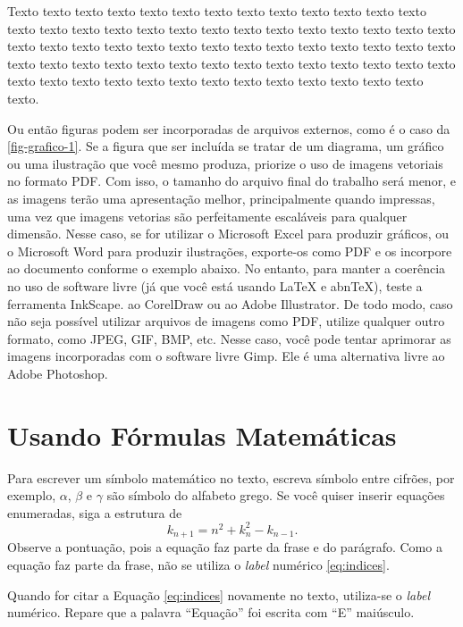     Texto texto texto texto texto texto texto texto texto texto texto texto texto texto texto texto texto texto texto texto texto texto texto texto texto texto texto texto texto texto texto texto texto texto texto texto texto texto texto texto texto texto texto texto texto texto texto texto texto texto texto texto texto texto texto texto texto texto texto texto texto texto texto texto texto texto texto texto texto.

    Ou então figuras podem ser incorporadas de arquivos externos, como é o caso da \autoref{fig-grafico-1}. Se a figura que ser incluída se tratar de um diagrama, um gráfico ou uma ilustração que você mesmo produza, priorize o uso de imagens vetoriais no formato PDF. Com isso, o tamanho do arquivo final do trabalho será menor, e as imagens terão uma apresentação melhor, principalmente quando impressas, uma vez que imagens vetorias são perfeitamente escaláveis para qualquer dimensão. Nesse caso, se for utilizar o Microsoft Excel para produzir gráficos, ou o Microsoft Word para produzir ilustrações, exporte-os como PDF e os incorpore ao documento conforme o exemplo abaixo. No entanto, para manter a coerência no uso de software livre (já que você está usando LaTeX e abnTeX),  teste a ferramenta InkScape. ao CorelDraw ou ao Adobe Illustrator.  De todo modo, caso não seja possível  utilizar arquivos de imagens como PDF, utilize qualquer outro formato, como JPEG, GIF, BMP, etc.  Nesse caso, você pode tentar aprimorar as imagens incorporadas com o software livre Gimp. Ele é uma alternativa livre ao Adobe Photoshop.

\section{Usando Fórmulas Matemáticas}

Para escrever um símbolo matemático no texto, escreva símbolo entre cifrões, por exemplo, $\alpha$, $\beta$ e $\gamma$ são símbolo do alfabeto grego. Se você quiser inserir equações enumeradas, siga a estrutura de
\begin{equation}
    \label{eq:indices}
	k_{n+1} = n^2 + k_n^2 - k_{n-1}.
\end{equation}
Observe a pontuação, pois a equação faz parte da frase e do parágrafo. Como a equação faz parte da frase, não se utiliza o \textit{label} numérico \ref{eq:indices}. 

Quando for citar a Equação \ref{eq:indices} novamente no texto, utiliza-se o \textit{label} numérico. Repare que a palavra ``Equação'' foi escrita com ``E'' maiúsculo. 

